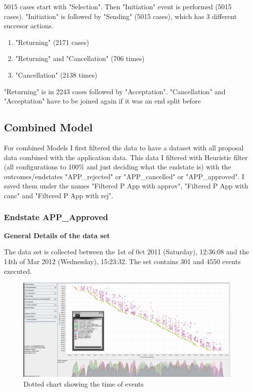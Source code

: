 5015 cases start with "Selection". Then "Initiation" event is performed (5015 cases). "Initiation" is followed by "Sending" (5015 cases), which has 3 different succesor actions. 
\begin{enumerate}
	\item "Returning" (2171 cases)
	\item "Returning" and "Cancellation" (706 times)
	\item "Cancellation"  (2138 times)
\end{enumerate}
"Returning" is in 2243 cases followed by "Acceptation". "Cancellation" and "Acceptation" have to be joined again if it was an end split before

\subsection{Combined Model}

For combined Models I first filtered the data to have a dataset with all proposal data combined with the application data. This data I filtered with Heuristic filter (all configurations to 100\% and just deciding what the endstate is) with the outcomes/endstates "APP\_rejected" or "APP\_cancelled" or "APP\_approved". I saved them under the names "Filtered P App with approv", "Filtered P App with canc" and "Filtered P App with rej". 

\subsubsection{Endstate APP\_Approved}

\textbf{General Details of the data set}

The data set is collected between the 1st of 0ct 2011 (Saturday), 12:36:08 and the 14th of Mar 2012 (Wednesday), 15:23:32. The set contains 301 and 4550 events executed. 

\begin{figure}[!htbp]
\centering
\includegraphics[height = 0.2\textheight]{ApprovalDot.PNG}
\caption{Dotted chart showing the time of events}
\label{fig:ApprovTimeFlow}
\end{figure}

